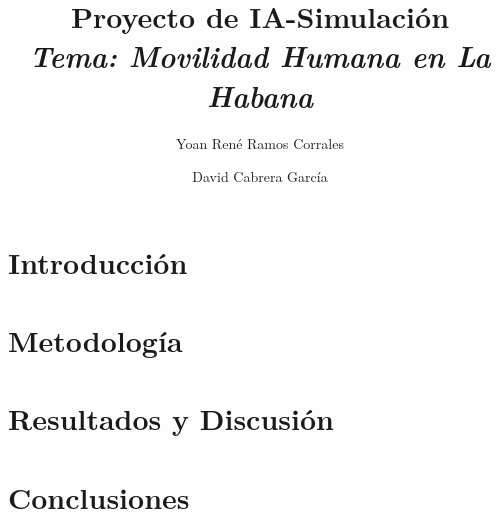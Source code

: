 \documentclass[a4paper,12pt]{article}
\title{Proyecto de IA-Simulaci\'on\\\textit{Tema: Movilidad Humana en La Habana}}
\author{Yoan Ren\'e Ramos Corrales \newline \and David Cabrera Garc\'ia}
\begin{document}
\maketitle

\renewcommand{\abstractname}{Abstract}
\begin{abstract}

\end{abstract}
\renewcommand{\abstractname}{Resumen}
\begin{abstract}

\end{abstract}


\tableofcontents
\newpage

\section{Introducción}

\section{Metodología}

\section{Resultados y Discusi\'on}

\section{Conclusiones}


\end{document}
